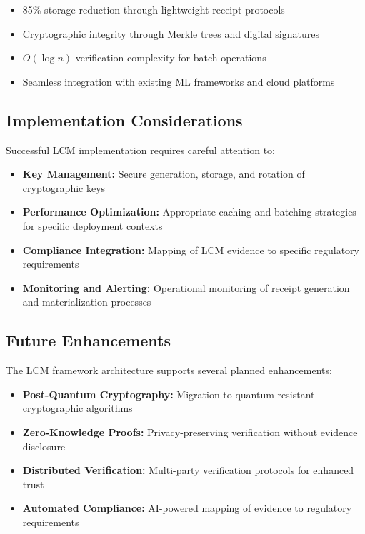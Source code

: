 \documentclass[12pt,a4paper]{article}
\begin{document}
\begin{itemize}
\item 85\% storage reduction through lightweight receipt protocols
\item Cryptographic integrity through Merkle trees and digital signatures  
\item $O(\log n)$ verification complexity for batch operations
\item Seamless integration with existing ML frameworks and cloud platforms
\end{itemize}

\subsection{Implementation Considerations}

Successful LCM implementation requires careful attention to:

\begin{itemize}
\item \textbf{Key Management:} Secure generation, storage, and rotation of cryptographic keys
\item \textbf{Performance Optimization:} Appropriate caching and batching strategies for specific deployment contexts
\item \textbf{Compliance Integration:} Mapping of LCM evidence to specific regulatory requirements
\item \textbf{Monitoring and Alerting:} Operational monitoring of receipt generation and materialization processes
\end{itemize}

\subsection{Future Enhancements}

The LCM framework architecture supports several planned enhancements:

\begin{itemize}
\item \textbf{Post-Quantum Cryptography:} Migration to quantum-resistant cryptographic algorithms
\item \textbf{Zero-Knowledge Proofs:} Privacy-preserving verification without evidence disclosure
\item \textbf{Distributed Verification:} Multi-party verification protocols for enhanced trust
\item \textbf{Automated Compliance:} AI-powered mapping of evidence to regulatory requirements
\end{itemize}
\end{document}
